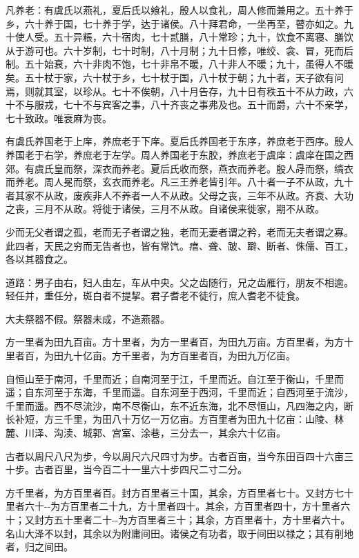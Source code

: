 \documentclass[]{article}
\begin{document}
凡养老：有虞氏以燕礼，夏后氏以飨礼，殷人以食礼，周人修而兼用之。五十养于乡，六十养于国，七十养于学，达于诸侯。八十拜君命，一坐再至，瞽亦如之。九十使人受。五十异粻，六十宿肉，七十贰膳，八十常珍；九十，饮食不离寝、膳饮从于游可也。六十岁制，七十时制，八十月制；九十日修，唯绞、衾、冒，死而后制。五十始衰，六十非肉不饱，七十非帛不暖，八十非人不暖；九十，虽得人不暖矣。五十杖于家，六十杖于乡，七十杖于国，八十杖于朝；九十者，天子欲有问焉，则就其室，以珍从。七十不俟朝，八十月告存，九十日有秩五十不从力政，六十不与服戎，七十不与宾客之事，八十齐丧之事弗及也。五十而爵，六十不亲学，七十致政。唯衰麻为丧。

有虞氏养国老于上庠，养庶老于下庠。夏后氏养国老于东序，养庶老于西序。殷人养国老于右学，养庶老于左学。周人养国老于东胶，养庶老于虞庠：虞庠在国之西郊。有虞氏皇而祭，深衣而养老。夏后氏收而祭，燕衣而养老。殷人冔而祭，缟衣而养老。周人冕而祭，玄衣而养老。凡三王养老皆引年。八十者一子不从政，九十者其家不从政，废疾非人不养者一人不从政。父母之丧，三年不从政。齐衰、大功之丧，三月不从政。将徙于诸侯，三月不从政。自诸侯来徙家，期不从政。

少而无父者谓之孤，老而无子者谓之独，老而无妻者谓之矜，老而无夫者谓之寡。此四者，天民之穷而无告者也，皆有常饩。瘖、聋、跛、躃、断者、侏儒、百工，各以其器食之。

道路：男子由右，妇人由左，车从中央。父之齿随行，兄之齿雁行，朋友不相逾。轻任并，重任分，斑白者不提挈。君子耆老不徒行，庶人耆老不徒食。

大夫祭器不假。祭器未成，不造燕器。

方一里者为田九百亩。方十里者，为方一里者百，为田九万亩。方百里者，为方十里者百，为田九十亿亩。方千里者，为方百里者百，为田九万亿亩。

自恒山至于南河，千里而近；自南河至于江，千里而近。自江至于衡山，千里而遥；自东河至于东海，千里而遥。自东河至于西河，千里而近；自西河至于流沙，千里而遥。西不尽流沙，南不尽衡山，东不近东海，北不尽恒山，凡四海之内，断长补短，方三千里，为田八十万亿一万亿亩。方百里者为田九十亿亩：山陵、林麓、川泽、沟渎、城郭、宫室、涂巷，三分去一，其余六十亿亩。

古者以周尺八尺为步，今以周尺六尺四寸为步。古者百亩，当今东田百四十六亩三十步。古者百里，当今百二十一里六十步四尺二寸二分。

方千里者，为方百里者百。封方百里者三十国，其余，方百里者七十。又封方七十里者六十-\/-为方百里者二十九，方十里者四十。其余，方百里者四十，方十里者六十；又封方五十里者二十-\/-为方百里者三十；其余，方百里者十，方十里者六十。名山大泽不以封，其余以为附庸间田。诸侯之有功者，取于间田以禄之；其有削地者，归之间田。
\end{document}
